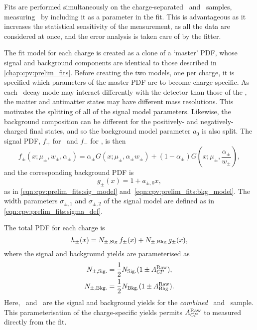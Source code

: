 Fits are performed simultaneously on the charge-separated \PLambdac\ and
\APLambdac\ samples, measuring \ARaw\ by including it as a parameter in the
fit.
This is advantageous as it increases the statistical sensitivity of the
measurement, as all the data are considered at once, and the error analysis is
taken care of by the fitter.

The fit model for each charge is created as a clone of a `master' \ac{PDF},
whose signal and background components are identical to those described in
\cref{chap:cpv:prelim_fits}.
Before creating the two models, one per charge, it is specified which
parameters of the master \ac{PDF} are to become charge-specific.
As each \PLambdac\ decay mode may interact differently with the detector than
those of the \APLambdac, the matter and antimatter states may have different
mass resolutions.
This motivates the splitting of all of the signal model parameters.
Likewise, the background composition can be different for the positively- and
negatively-charged final states, and so the background model parameter $a_{0}$
is also split.
The signal \ac{PDF}, $f_{+}$ for \PLambdac\ and $f_{-}$ for \APLambdac, is then
\begin{equation}
  f_{\pm}(x; \mu_{\pm}, w_{\pm}, \alpha_{\pm}) =
    \alpha_{\pm}{}G(x; \mu_{\pm}, \alpha_{\pm}w_{\pm}) +
    (1 - \alpha_{\pm})G(x; \mu_{\pm}, \frac{\alpha_{\pm}}{w_{\pm}}),
\end{equation}
and the corresponding background \ac{PDF} is
\begin{equation}
  g_{\pm}(x) = 1 + a_{\pm,0}x,
\end{equation}
as in \cref{eqn:cpv:prelim_fits:sig_model}
and~\cref{eqn:cpv:prelim_fits:bkg_model}.
The width parameters $\sigma_{\pm, 1}$ and  $\sigma_{\pm, 2}$ of the signal
model are defined as in \cref{eqn:cpv:prelim_fits:sigma_def}.

The total \ac{PDF} for each charge is
\begin{equation}
  h_{\pm}(x) = N_{\pm,\text{Sig.}} f_{\pm}(x) + N_{\pm,\text{Bkg.}} g_{\pm}(x),
\end{equation}
where the signal and background yields are parameterised as
\begin{align}
  N_{\pm,\text{Sig.}} &= \frac{1}{2}N_{\text{Sig.}}(1 \pm A_{C\!P}^{\textnormal{Raw}}),\\
  N_{\pm,\text{Bkg.}} &= \frac{1}{2}N_{\text{Bkg.}}(1 \pm A_{\textnormal{Bkg}}^{\textnormal{Raw}}).
\end{align}
Here, \nsig\ and \nbkg\ are the signal and background yields for the
\emph{combined} \PLambdac\ and \APLambdac\ sample.
This parameterisation of the charge-specific yields permits $A_{C\!P}^{\textnormal{Raw}}$ to measured
directly from the fit.

